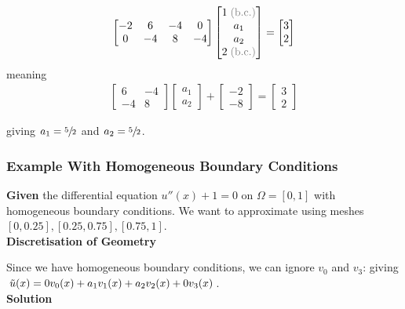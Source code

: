 \begin{align*}
    \begin{bmatrix}
        -2 & 6 & -4 & 0 \\
        0 & -4 & 8 & -4
    \end{bmatrix}
    \begin{bmatrix}
        1\;\text{\color{gray} (b.c.)} \\
        a_1 \\
        a_2 \\
        2\;\text{\color{gray} (b.c.)}
    \end{bmatrix}
    = \begin{bmatrix}
        3 \\ 2
    \end{bmatrix}
\end{align*}
meaning
\begin{align*}
    \begin{bmatrix}
        6 & -4 \\
        -4 & 8
    \end{bmatrix}
    \begin{bmatrix}
        a_1 \\ a_2
    \end{bmatrix}
    +
    \begin{bmatrix}
        -2 \\ -8
    \end{bmatrix}
    =
    \begin{bmatrix}
        3 \\ 2
    \end{bmatrix}
\end{align*}

giving $a_1 = \sfrac{5}{2}$ and $a_2 = \sfrac{5}{2}$.

\subsubsection{Example With Homogeneous Boundary Conditions}

\textbf{Given} the differential equation $u''(x) + 1 = 0$ on $\Omega = [0,1]$ with homogeneous boundary conditions.
We want to approximate using meshes $[0,0.25], [0.25, 0.75], [0.75, 1]$.
\\[1em]
\textbf{Discretisation of Geometry}

Since we have homogeneous boundary conditions, we can ignore $v_0$ and $v_3$:
giving $\tilde{u}(x) = 0 v_0(x)+a_1v_1(x)+a_2v_2(x)+0v_3(x)$.
\\[1em]
\textbf{Solution}

